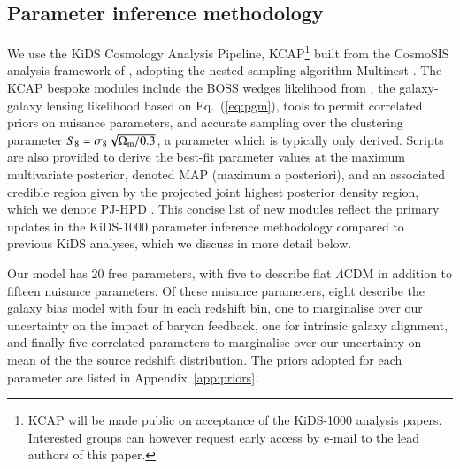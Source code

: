 \subsection{Parameter inference methodology}
\label{sec:KCAP}
We use the KiDS Cosmology Analysis Pipeline, {\sc KCAP}\footnote{KCAP will be made public on acceptance of the KiDS-1000 analysis papers.   Interested groups can however request early access by e-mail to the lead authors of this paper.} built from the {\sc CosmoSIS} analysis framework of \citet{zuntz/etal:2015}, adopting the nested sampling algorithm {\sc Multinest} \citep{feroz/hobson:2008,feroz/etal:2009,feroz/etal:2019}.  The {\sc KCAP} bespoke modules include the BOSS wedges likelihood from \citet{sanchez/etal:2017}, the galaxy-galaxy lensing likelihood based on Eq.~(\ref{eq:pgm}),  tools to permit correlated priors on nuisance parameters, and accurate sampling over the clustering parameter $S_8= \sigma_8 \sqrt{\Omega_{\rm m}/0.3}$, a parameter which is typically only derived.  Scripts are also provided to derive the best-fit parameter values at the maximum multivariate posterior, denoted MAP (maximum a posteriori), and an associated credible region given by the projected joint highest posterior density region, which we denote PJ-HPD \citep{joachimi/etal:inprep}.  
This concise list of new modules reflect the primary updates in the KiDS-1000 parameter inference methodology compared to previous KiDS analyses, which we discuss in more detail below.

Our \tttp model has 20 free parameters, with five to describe flat $\Lambda$CDM in addition to fifteen nuisance parameters.   Of these nuisance parameters, eight describe the galaxy bias model with four in each redshift bin, one to marginalise over our uncertainty on the impact of baryon feedback, one for intrinsic galaxy alignment, and finally five correlated parameters to marginalise over our uncertainty on mean of the the source redshift distribution.   The priors adopted for each parameter are listed in Appendix~\ref{app:priors}.  

